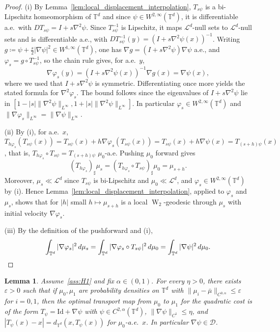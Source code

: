 \documentclass[11pt]{article}
\numberwithin{equation}{section}
\newtheorem{lemma}[theorem]{Lemma}
\theoremstyle{definition}
\newcommand{\T}{\mathbb{T}}
\newcommand{\Wtwo}{\operatorname{W}_2}
\begin{document}
\begin{proof}
    (i) By Lemma~\ref{lem:local_displacement_interpolation}, $T_{s\psi}$ is a bi-Lipschitz homeomorphism of $\T^d$ and since $\psi \in W^{2,\infty}(\T^d)$, it is differentiable a.e.\ with $DT_{s\psi} = I + s \nabla^2\psi$.
    Since $T_{s\psi}^{-1}$ is Lipschitz, it maps $\mathcal{L}^d$-null sets to $\mathcal{L}^d$-null sets and is differentiable a.e., with $DT_{s\psi}^{-1}(y) = \left(I + s\nabla^2\psi(x)\right)^{-1}$.
    Writing $g \coloneqq \psi + \frac{s}{2}|\nabla\psi|^2 \in W^{1,\infty}(\T^d)$, one has $\nabla g = (I + s\nabla^2\psi)\nabla\psi$ a.e., and $\varphi_s = g \circ T_{s\psi}^{-1}$, so the chain rule gives, for a.e.\ $y$,
    \[
    \nabla\varphi_s(y) = \left(I + s\nabla^2\psi(x)\right)^{-1} \nabla g(x) = \nabla\psi(x),
    \]
    where we used that $I + s\nabla^2\psi$ is symmetric.
    Differentiating once more yields the stated formula for $\nabla^2\varphi_s$.
    The bound follows since the eigenvalues of $I + s\nabla^2\psi$ lie in $[1 - |s| \|\nabla^2\psi\|_{L^\infty}, 1 + |s| \|\nabla^2\psi\|_{L^\infty}]$.
    In particular $\varphi_s \in W^{2,\infty}(\T^d)$ and $\|\nabla\varphi_s\|_{L^\infty} = \|\nabla\psi\|_{L^\infty}$.

    (ii) By (i), for a.e.\ $x$, $T_{h\varphi_s} (T_{s\psi}(x)) = T_{s\psi}(x) + h \nabla\varphi_s(T_{s\psi}(x)) = T_{s\psi}(x) + h \nabla\psi(x) = T_{(s+h)\psi}(x)$,
    that is, $T_{h\varphi_s}\circ T_{s\psi} = T_{(s+h)\psi}$ $\mu_0$-a.e.
    Pushing $\mu_0$ forward gives 
    \[
    (T_{h\varphi_s})_\sharp\mu_s = (T_{h\varphi_s}\circ T_{s\psi})_\sharp\mu_0 = \mu_{s+h}.
    \]
    Moreover, $\mu_s \ll \mathcal{L}^d$ since $T_{s\psi}$ is bi-Lipschitz and $\mu_0 \ll \mathcal{L}^d$, and $\varphi_s \in W^{2,\infty}(\T^d)$ by (i).
    Hence Lemma~\ref{lem:local_displacement_interpolation}, applied to $\varphi_s$ and $\mu_s$, shows that for $|h|$ small $h \mapsto \mu_{s+h}$ is a local $\Wtwo$-geodesic through $\mu_s$ with initial velocity $\nabla\varphi_s$.

    (iii) By the definition of the pushforward and (i),
    \[
    \int_{\T^d}|\nabla\varphi_s|^2\,d\mu_s = \int_{\T^d}|\nabla\varphi_s \circ T_{s\psi}|^2\,d\mu_0 = \int_{\T^d}|\nabla\psi|^2\,d\mu_0. \qedhere
    \]
\end{proof}

\begin{lemma}
    \label{lem:brenier_stability}
    Assume~\ref{ass:H1} and fix $\alpha \in (0,1)$.
    For every $\eta > 0$, there exists $\varepsilon > 0$ such that if $\mu_0, \mu_1$ are probability densities on $\T^d$ with $\|\mu_i - \bar\mu\|_{C^{0,\alpha}} \le \varepsilon$ for $i = 0,1$, then the optimal transport map from $\mu_0$ to $\mu_1$ for the quadratic cost is of the form $T_\psi = \mathrm{Id} + \nabla\psi$ with $\psi \in C^{2,\alpha}(\T^d)$,
    $\|\nabla\psi\|_{C^1} \le \eta$, and $|T_\psi(x) - x| = d_{\T^d}(x, T_\psi(x))$ for $\mu_0$-a.e.\ $x$.
    In particular $\nabla\psi \in \mathscr{D}$.
\end{lemma}
\end{document}
